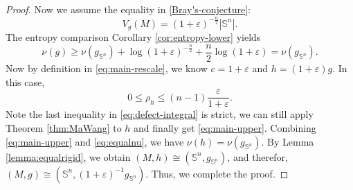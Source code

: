\documentclass[10pt,a4paper]{amsart}
\newcommand{\Sph}{\mathbb S}
\newcommand{\eps}{\varepsilon}
\begin{document}
\begin{proof}
{Now we assume the equality in \eqref{Bray's-conjecture}: 
\begin{equation*}
V_g(M)=(1+\eps)^{-\frac{n}{2}}|\Sph^n|.    
\end{equation*}
The entropy comparison Corollary \ref{cor:entropy-lower} yields
\begin{equation}\label{eq:equalnu}
\nu(g)\geq\nu(g_{\Sph^n})+\log(1+\eps)^{-\frac{n}{2}}
+\frac n2\log(1+\eps)=\nu(g_{\Sph^n}).
\end{equation}
Now by definition in \eqref{eq:main-rescale}, we know $c=1+\eps$ and $h=(1+\eps)g$. In this case,
$$0\leq \rho_h\leq (n-1)\frac{\eps}{1+\eps}.$$
Note the last inequality in \eqref{eq:defect-integral} is strict, we can still apply Theorem \ref{thm:MaWang} to $h$ and finally get \eqref{eq:main-upper}.
Combining \eqref{eq:main-upper} and \eqref{eq:equalnu}, we have $\nu(h)=\nu(g_{\Sph^n}).$ By Lemma \ref{lemma:equalrigid}, we obtain $(M, h)\cong(\Sph^n, g_{\Sph^n})$, and therefor, $(M, g)\cong(\Sph^n, (1+\eps)^{-1}g_{\Sph^n})$. Thus, we complete the proof.}

\end{proof}
\end{document}
